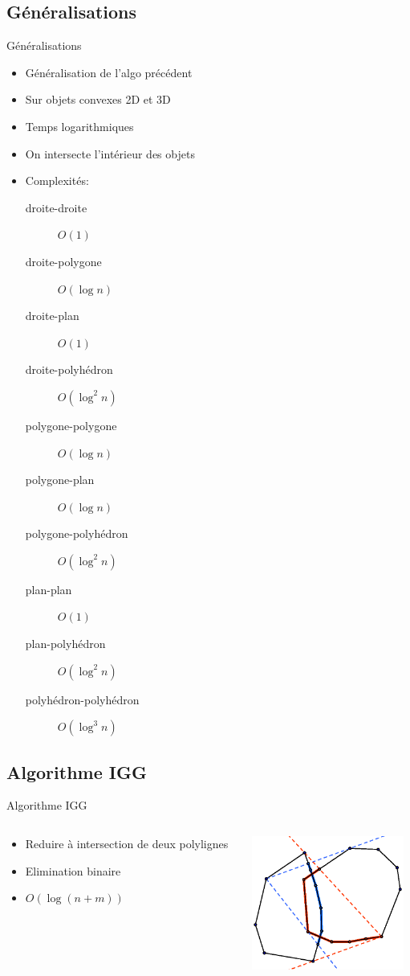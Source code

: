 \documentclass{beamer}
\begin{document}
\subsection{Généralisations}

\begin{frame}{Généralisations}
	\begin{itemize}
	\item Généralisation de l'algo précédent
	\item Sur objets convexes 2D et 3D
	\item Temps logarithmiques
	\item On intersecte l'intérieur des objets
	\item Complexités:
		\begin{description}
		\item[droite-droite] $O(1)$
		\item[droite-polygone] $O(\log n)$
		\item[droite-plan] $O(1)$
		\item[droite-polyhédron] $O(\log^{2} n)$
		\item[polygone-polygone] $O(\log n)$
		\item[polygone-plan] $O(\log n)$
		\item[polygone-polyhédron] $O(\log^{2} n)$
		\item[plan-plan] $O(1)$
		\item[plan-polyhédron] $O(\log^{2} n)$
		\item[polyhédron-polyhédron] $O(\log^{3} n)$
		\end{description}
	\end{itemize}
\end{frame}

\subsection{Algorithme IGG}

\begin{frame}{Algorithme IGG}
	\begin{columns}[c]
	\begin{column}[T]{.5\textwidth}
		\begin{itemize}
		\item Reduire à intersection de deux polylignes
		\item Elimination binaire
		\item $O(\log (n + m))$
		\end{itemize}
	\end{column}
	\begin{column}[T]{.5\textwidth}
		\includegraphics[width=5cm]{igg1.eps}
	\end{column}
	\end{columns}
\end{frame}
\end{document}
